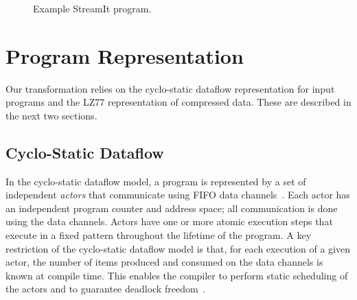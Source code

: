 \newcommand{\x}{\hspace{1.3pt}} %
\newcommand{\concat}[0]{\bullet}               %
\newcommand{\name}[1]{~~\hfill\framebox{#1}}   %

\newcommand{\skiptop}[0]{\vspace{-13pt}\\}   %
\newcommand{\skiptopa}[0]{\vspace{-1pt}\\}   %
\newcommand{\skiptopb}[0]{\vspace{-3pt}\\}   %
\newcommand{\skipbot}[0]{\vspace{-3pt}\\}    %

\newcommand{\tup}[2]{\langle#1, #2\rangle}

\newcommand{\pos}[0]{\mbox{\it pos}}

\newcommand{\tab}[0]{\mbox{~~~~}}


\begin{figure}[t]
\caption{Example StreamIt program.
\protect\label{fig:streamit}}
\end{figure}

\section{Program Representation}

Our transformation relies on the cyclo-static dataflow representation
for input programs and the LZ77 representation of compressed data.
These are described in the next two sections.

\subsection{Cyclo-Static Dataflow}

In the cyclo-static dataflow model, a program is represented by a set
of independent {\it actors} that communicate using FIFO data
channels~\cite{LM87-i,bilsen95-cyclostatic}.  Each actor has an
independent program counter and address space; all communication is
done using the data channels.  Actors have one or more atomic
execution steps that execute in a fixed pattern throughout the
lifetime of the program.  A key restriction of the cyclo-static
dataflow model is that, for each execution of a given actor, the
number of items produced and consumed on the data channels is known at
compile time.  This enables the compiler to perform static scheduling
of the actors and to guarantee deadlock freedom~\cite{LM87-i,bilsen95-cyclostatic}.

